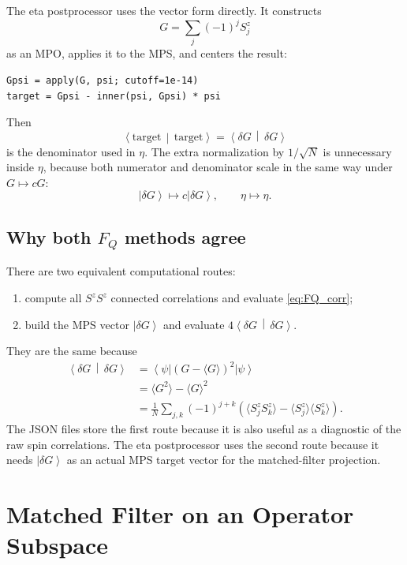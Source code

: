 \documentclass[11pt]{article}
\newcommand{\ket}[1]{\left|#1\right\rangle}
\newcommand{\bra}[1]{\left\langle#1\right|}
\newcommand{\braket}[2]{\left\langle#1\,\middle|\,#2\right\rangle}
\newcommand{\dd}{\delta}
\begin{document}
The eta postprocessor uses the vector form directly.  It constructs
\[
  G=\sum_j(-1)^jS^z_j
\]
as an MPO, applies it to the MPS, and centers the result:
\begin{lstlisting}
Gpsi = apply(G, psi; cutoff=1e-14)
target = Gpsi - inner(psi, Gpsi) * psi
\end{lstlisting}
Then
\begin{equation}
  \braket{\mathrm{target}}{\mathrm{target}}
  =
  \braket{\dd G}{\dd G}
\end{equation}
is the denominator used in $\eta$.  The extra normalization by
$1/\sqrt N$ is unnecessary inside $\eta$, because both numerator and
denominator scale in the same way under $G\mapsto cG$:
\[
  \ket{\dd G}\mapsto c\ket{\dd G},
  \qquad
  \eta\mapsto \eta.
\]

\subsection{Why both \texorpdfstring{$F_Q$}{FQ} methods agree}

There are two equivalent computational routes:
\begin{enumerate}
  \item compute all $S^zS^z$ connected correlations and evaluate
  \eqref{eq:FQ_corr};
  \item build the MPS vector $\ket{\dd G}$ and evaluate
  $4\braket{\dd G}{\dd G}$.
\end{enumerate}
They are the same because
\begin{align}
  \braket{\dd G}{\dd G}
  &=
  \bra{\psi}
  \left(G-\langle G\rangle\right)^2
  \ket{\psi} \\
  &=
  \langle G^2\rangle-\langle G\rangle^2 \\
  &=
  \frac1N
  \sum_{j,k}
  (-1)^{j+k}
  \left(
    \langle S^z_jS^z_k\rangle
    -
    \langle S^z_j\rangle\langle S^z_k\rangle
  \right).
\end{align}
The JSON files store the first route because it is also useful as a
diagnostic of the raw spin correlations.  The eta postprocessor uses the
second route because it needs $\ket{\dd G}$ as an actual MPS target
vector for the matched-filter projection.

\section{Matched Filter on an Operator Subspace}
\end{document}
